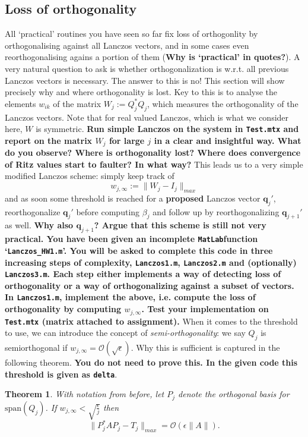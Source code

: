 \documentclass[12pt]{article}
\newtheorem{theorem}{Theorem}
\begin{document}
\subsection{Loss of orthogonality}
All `practical' routines you have seen so far fix loss of orthogonlity by orthogonalising against all Lanczos vectors, and in some cases even reorthogonalising agains a portion of them (\textbf{Why is `practical' in quotes?}). A very natural question to ask is whether orthogonalization is w.r.t. all previous Lanczos vectors is necessary. The answer to this is no! This section will show precisely why and where orthogonality is lost. Key to this is to analyse the elements $w_{ik}$ of the matrix $W_j:=Q_{j}^{\ast}Q_{j}$, which measures the orthogonality of the Lanczos vectors. Note that for real valued Lanczos, which is what we consider here, $W$ is symmetric. \textbf{Run simple Lanczos on the system in \texttt{Test.mtx} and report on the matrix $W_j$ for large $j$ in a clear and insightful way. What do you observe? Where is orthogonality lost? Where does convergence of Ritz values start to faulter? In what way?}
This leads us to a very simple modified Lanczos scheme: simply keep track of 
$$w_{j,\infty}:=\|W_j-I_j\|_{max}$$
and as soon some threshold is reached for a \textbf{proposed} Lanczos vector $\mathbf{q}_j'$, reorthogonalize $\mathbf{q}_j'$ before computing $\beta_j$ and follow up by reorthogonalizing $\mathbf{q}_{j+1}'$ as well. \textbf{Why also $\mathbf{q}_{j+1}$? Argue that this scheme is still not very practical. You have been given an incomplete \texttt{MatLab}function `\texttt{Lanczos\_HW1.m}'. You will be asked to complete this code in three increasing steps of complexity, \texttt{Lanczos1.m}, \texttt{Lanczos2.m} and (optionally) \texttt{Lanczos3.m}. Each step either implements a way of detecting loss of orthogonality or a way of orthogonalizing against a subset of vectors. In \texttt{Lanczos1.m}, implement the above, i.e. compute the loss of orthogonality by computing $w_{j,\infty}$. Test your implementation on \texttt{Test.mtx} (matrix attached to assignment).} When it comes to the threshold to use, we can introduce the concept of \emph{semi-orthogonality}: we say $Q_j$ is semiorthogonal if $w_{j,\infty}=\mathcal{O}(\sqrt{\epsilon})$. Why this is sufficient is captured in the following theorem. \textbf{You do not need to prove this. In the given code this threshold is given as \texttt{delta}}.
\begin{theorem}
With notation from before, let $P_j$ denote the orthogonal basis for $\text{span}(Q_j)$.
If $w_{j,\infty}<\sqrt{\frac{\epsilon}{j}}$ then
$$\|P_j^{\ast}AP_j-T_j\|_{max}=\mathcal{O}(\epsilon\|A\|).$$ 
\end{theorem}
\end{document}
